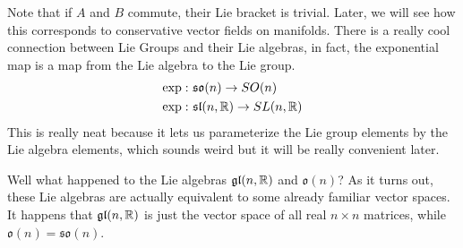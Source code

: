 Note that if $A$ and $B$ commute, their Lie bracket is trivial. Later, we will see
how this corresponds to conservative vector fields on manifolds. There is a really
cool connection between Lie Groups and their Lie algebras, in fact, the exponential
map is a map from the Lie algebra to the Lie group.
\begin{align}\label{eq:2}
    \exp: & \ \mathfrak{so}(n) \to SO(n)\\
    \exp: & \ \mathfrak{sl}(n, \mathbb{R}) \to SL(n, \mathbb{R})
\end{align}
This is really neat because it lets us parameterize the Lie group elements by the
Lie algebra elements, which sounds weird but it will be really convenient later.

Well what happened to the Lie algebras $\mathfrak{gl}(n, \mathbb{R})$ and $\mathfrak{o}(n)$?
As it turns out, these Lie algebras are actually equivalent to some already familiar
vector spaces. It happens that $\mathfrak{gl}(n, \mathbb{R})$ is just the vector space of
all real $n\times n$ matrices, while $\mathfrak{o}(n) = \mathfrak{so}(n)$.






